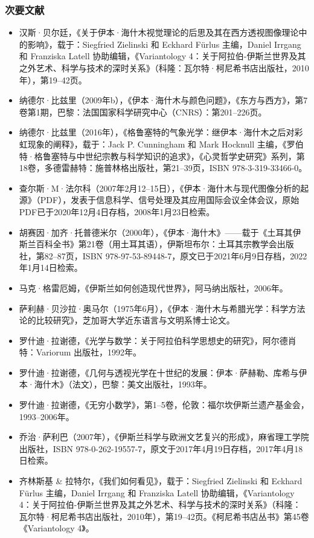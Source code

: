 \subsubsection{次要文献}
\begin{itemize}
\item 汉斯·贝尔廷，《关于伊本·海什木视觉理论的后思及其在西方透视图像理论中的影响》，载于：Siegfried Zielinski 和 Eckhard Fürlus 主编，Daniel Irrgang 和 Franziska Latell 协助编辑，《Variantology 4：关于阿拉伯-伊斯兰世界及其之外艺术、科学与技术的深时关系》（科隆：瓦尔特·柯尼希书店出版社，2010年），第19–42页。
\item 纳德尔·比兹里（2009年b），《伊本·海什木与颜色问题》，《东方与西方》，第7卷第1期，巴黎：法国国家科学研究中心（CNRS）：第201–226页。
\item 纳德尔·比兹里（2016年），《格鲁塞特的气象光学：继伊本·海什木之后对彩虹现象的阐释》，载于：Jack P. Cunningham 和 Mark Hocknull 主编，《罗伯特·格鲁塞特与中世纪宗教与科学知识的追求》，《心灵哲学史研究》系列，第18卷，多德雷赫特：施普林格出版社，第21–39页，ISBN 978-3-319-33466-0。
\item 查尔斯·M·法尔科（2007年2月12–15日），《伊本·海什木与现代图像分析的起源》（PDF），发表于信息科学、信号处理及其应用国际会议全体会议，原始PDF已于2020年12月4日存档，2008年1月23日检索。
\item 胡赛因·加齐·托普德米尔（2000年），《伊本·海什木》——载于《土耳其伊斯兰百科全书》第21卷（用土耳其语），伊斯坦布尔：土耳其宗教学会出版社，第82–87页，ISBN 978-97-53-89448-7，原文已于2021年6月9日存档，2022年1月14日检索。
\item 马克·格雷厄姆，《伊斯兰如何创造现代世界》，阿马纳出版社，2006年。
\item 萨利赫·贝沙拉·奥马尔（1975年6月），《伊本·海什木与希腊光学：科学方法论的比较研究》，芝加哥大学近东语言与文明系博士论文。
\item 罗什迪·拉谢德，《光学与数学：关于阿拉伯科学思想史的研究》，阿尔德肖特：Variorum 出版社，1992年。
\item 罗什迪·拉谢德，《几何与透视光学在十世纪的发展：伊本·萨赫勒、库希与伊本·海什木》（法文），巴黎：美文出版社，1993年。
\item 罗什迪·拉谢德，《无穷小数学》，第1–5卷，伦敦：福尔坎伊斯兰遗产基金会，1993–2006年。
\item 乔治·萨利巴（2007年），《伊斯兰科学与欧洲文艺复兴的形成》，麻省理工学院出版社，ISBN 978-0-262-19557-7，原文于2017年4月19日存档，2017年4月18日检索。
\item 齐林斯基 & 拉特尔，《我们如何看见》，载于：Siegfried Zielinski 和 Eckhard Fürlus 主编，Daniel Irrgang 和 Franziska Latell 协助编辑，《Variantology 4：关于阿拉伯-伊斯兰世界及其之外艺术、科学与技术的深时关系》（科隆：瓦尔特·柯尼希书店出版社，2010年），第19–42页。《柯尼希书店丛书》第45卷《Variantology 4》。
\end{itemize}

